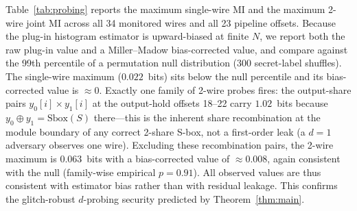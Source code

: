 \documentclass[lettersize,journal]{IEEEtran}
\begin{document}
Table~\ref{tab:probing} reports the maximum single-wire MI and the
maximum 2-wire joint MI
across all 34 monitored wires and all 23 pipeline offsets.  Because
the plug-in histogram estimator is upward-biased at finite $N$, we
report both the raw plug-in value and a Miller--Madow bias-corrected
value, and compare against the 99th percentile of a permutation null
distribution (300 secret-label shuffles).  The single-wire maximum
($0.022$~bits) sits below the null percentile and its
bias-corrected value is $\approx 0$.  Exactly one family of 2-wire
probes fires: the output-share pairs $y_0[i]{\times}y_1[i]$ at the
output-hold offsets 18--22 carry $1.02$~bits because
$y_0 \oplus y_1 = \mathrm{Sbox}(S)$ there---this is the inherent
share recombination at the module boundary of any correct 2-share
S-box, not a first-order leak (a $d{=}1$ adversary observes one
wire).  Excluding these recombination pairs, the 2-wire maximum is
$0.063$~bits with a bias-corrected value of $\approx 0.008$, again
consistent with the null (family-wise empirical $p = 0.91$).  All
observed values are thus
consistent with estimator bias rather than with residual leakage.
This confirms the glitch-robust $d$-probing security predicted by
Theorem~\ref{thm:main}.
\end{document}
